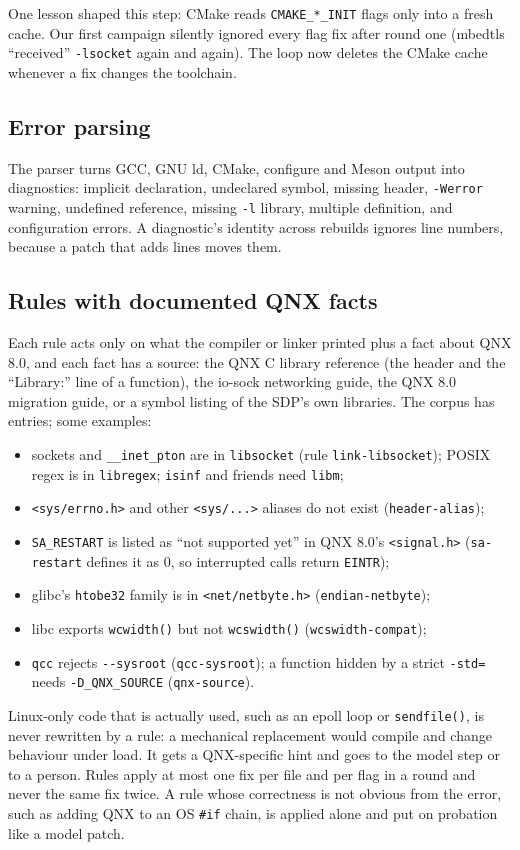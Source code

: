 \documentclass[conference]{IEEEtran}
\begin{document}
One lesson shaped this step: CMake reads \texttt{CMAKE\_*\_INIT} flags only into a fresh cache. Our first
campaign silently ignored every flag fix after round one (mbedtls ``received'' \texttt{-lsocket} again and again).
The loop now deletes the CMake cache whenever a fix changes the toolchain.

\subsection{Error parsing}\label{sec:errors}
The parser turns GCC, GNU ld, CMake, configure and Meson output into diagnostics: implicit declaration,
undeclared symbol, missing header, \texttt{-Werror} warning, undefined reference, missing \texttt{-l} library,
multiple definition, and configuration errors. A diagnostic's identity across rebuilds ignores line numbers,
because a patch that adds lines moves them.

\subsection{Rules with documented QNX facts}\label{sec:rules}
Each rule acts only on what the compiler or linker printed plus a fact about QNX 8.0, and each fact has a source:
the QNX C library reference (the header and the ``Library:'' line of a function), the io-sock networking guide,
the QNX 8.0 migration guide, or a symbol listing of the SDP's own libraries. The corpus has 
entries; some examples:
\begin{itemize}
\item sockets and \texttt{\_\_inet\_pton} are in \texttt{libsocket} (rule \texttt{link-libsocket});
POSIX regex is in \texttt{libregex}; \texttt{isinf} and friends need \texttt{libm};
\item \texttt{<sys/errno.h>} and other \texttt{<sys/...>} aliases do not exist (\texttt{header-alias});
\item \texttt{SA\_RESTART} is listed as ``not supported yet'' in QNX 8.0's \texttt{<signal.h>}
(\texttt{sa-restart} defines it as 0, so interrupted calls return \texttt{EINTR});
\item glibc's \texttt{htobe32} family is in \texttt{<net/netbyte.h>} (\texttt{endian-netbyte});
\item libc exports \texttt{wcwidth()} but not \texttt{wcswidth()} (\texttt{wcswidth-compat});
\item \texttt{qcc} rejects \texttt{-{}-sysroot} (\texttt{qcc-sysroot}); a function hidden by a strict
\texttt{-std=} needs \texttt{-D\_QNX\_SOURCE} (\texttt{qnx-source}).
\end{itemize}
Linux-only code that is actually used, such as an epoll loop or \texttt{sendfile()}, is never rewritten by a
rule: a mechanical replacement would compile and change behaviour under load. It gets a QNX-specific hint and
goes to the model step or to a person. Rules apply at most one fix per file and per flag in a round and never the
same fix twice. A rule whose correctness is not obvious from the error, such as adding QNX to an OS
\texttt{\#if} chain, is applied alone and put on probation like a model patch.
\end{document}
